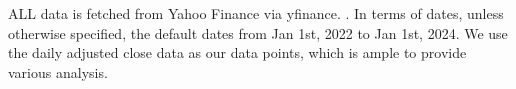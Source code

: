 









ALL data is fetched from Yahoo Finance via yfinance. \cite{yfinance}. In terms of dates, unless otherwise specified, the default dates from Jan 1st, 2022 to Jan 1st, 2024. We use the daily adjusted close data as our data points, which is ample to provide various analysis.

